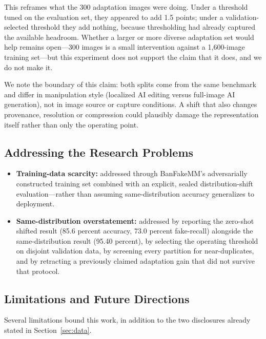 \documentclass[conference,a4paper]{IEEEtran}
\begin{document}
This reframes what the 300 adaptation images were doing. Under a threshold
tuned on the evaluation set, they appeared to add 1.5 points; under a
validation-selected threshold they add nothing, because thresholding had
already captured the available headroom. Whether a larger or more diverse
adaptation set would help remains open---300 images is a small intervention
against a 1{,}600-image training set---but this experiment does not support the
claim that it does, and we do not make it.

We note the boundary of this claim: both splits come from the same benchmark
and differ in manipulation style (localized AI editing versus full-image AI
generation), not in image source or capture conditions. A shift that also
changes provenance, resolution or compression could plausibly damage the
representation itself rather than only the operating point.

\subsection{Addressing the Research Problems}

\begin{itemize}
\item \textbf{Training-data scarcity:} addressed through BanFakeMM's
adversarially constructed training set combined with an explicit, sealed
distribution-shift evaluation---rather than assuming same-distribution
accuracy generalizes to deployment.

\item \textbf{Same-distribution overstatement:} addressed by reporting the
zero-shot shifted result (85.6 percent accuracy, 73.0 percent fake-recall)
alongside the same-distribution result (95.40 percent), by selecting the
operating threshold on disjoint validation data, by screening every partition
for near-duplicates, and by retracting a previously claimed adaptation gain
that did not survive that protocol.
\end{itemize}

\subsection{Limitations and Future Directions}
\label{sec:limitations}

Several limitations bound this work, in addition to the two disclosures
already stated in Section~\ref{sec:data}.
\end{document}
